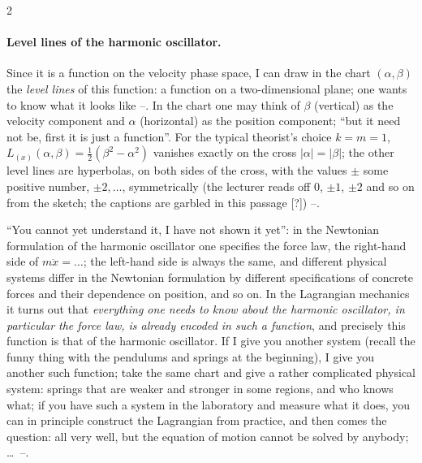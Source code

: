 \begin{paracol}{2}
\paragraph{Level lines of the harmonic oscillator.} Since it is a function on the velocity phase space, I can draw in the chart $(\alpha,\beta)$ the \emph{level lines} of this function: a function on a two-dimensional plane; one wants to know what it looks like --. In the chart one may think of $\beta$ (vertical) as the velocity component and $\alpha$ (horizontal) as the position component; ``but it need not be, first it is just a function''. For the typical theorist's choice $k=m=1$, $L_{(x)}(\alpha,\beta)=\tfrac12(\beta^2-\alpha^2)$ vanishes exactly on the cross $|\alpha|=|\beta|$; the other level lines are hyperbolas, on both sides of the cross, with the values $\pm$ some positive number, $\pm 2,\dots$, symmetrically (the lecturer reads off $0$, $\pm1$, $\pm2$ and so on from the sketch; the captions are garbled in this passage [?]) --.

\begin{intuition}\label{int:lag-replaces}
``You cannot yet understand it, I have not shown it yet'': in the Newtonian formulation of the harmonic oscillator one specifies the force law, the right-hand side of $m\ddot x=\dots$; the left-hand side is always the same, and different physical systems differ in the Newtonian formulation by different specifications of concrete forces and their dependence on position, and so on. In the Lagrangian mechanics it turns out that \emph{everything one needs to know about the harmonic oscillator, in particular the force law, is already encoded in such a function}, and precisely this function is that of the harmonic oscillator.
If I give you another system (recall the funny thing with the pendulums and springs at the beginning), I give you another such function; take the same chart and give a rather complicated physical system: springs that are weaker and stronger in some regions, and who knows what; if you have such a system in the laboratory and measure what it does, you can in principle construct the Lagrangian from practice, and then comes the question: all very well, but the equation of motion cannot be solved by anybody; \dots\ --.
\end{intuition}


\end{paracol}
